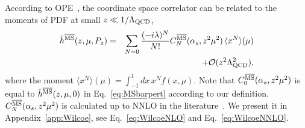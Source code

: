\documentclass[prd,aps,twocolumn,preprintnumbers, showpacs, nofootinbib,superscriptaddress,notitlepage]{revtex4-2}
\def\bea{\begin{eqnarray}}
\def\eea{\end{eqnarray}}
\begin{document}

According to OPE~\cite{Radyushkin:2017cyf,Braun:2007wv,Izubuchi:2018srq}, the coordinate space correlator can be related to the moments of PDF
at small $z\ll 1/\Lambda_{\rm QCD}$, 
\bea\label{eq:OPE}
\tilde{h}^{\overline{\rm MS}}(z, \mu, P_{z}) 
=&&\sum_{N=0}\frac{(-i\lambda)^N}{N!} C^{\overline{\rm MS}}_{N}(\alpha_{s},z^2 \mu^2) \, \langle x^N \rangle(\mu) \nonumber\\
&&+ {\cal O}(z^2 \Lambda_{\rm QCD}^2), 
\eea
where the moment $\langle x^N \rangle(\mu)=\int_{-1}^{1}dx \, x^N f(x,\mu)$.
Note that $C^{\overline{\rm MS}}_{0}(\alpha_{s},z^2 \mu^2)$ is equal to $\tilde{h}^{\overline{\rm MS}}(z, \mu, 0)$ in Eq.~\eqref{eq:MSbarpert} according to our definition. $C^{\overline{\rm MS}}_{N}(\alpha_{s},z^2 \mu^2)$ is calculated up to NNLO in the literature~\cite{Li:2020xml}. We present it in Appendix~\ref{app:Wilcoe}, see Eq.~\eqref{eq:WilcoeNLO} and Eq.~\eqref{eq:WilcoeNNLO}. 
\end{document}
